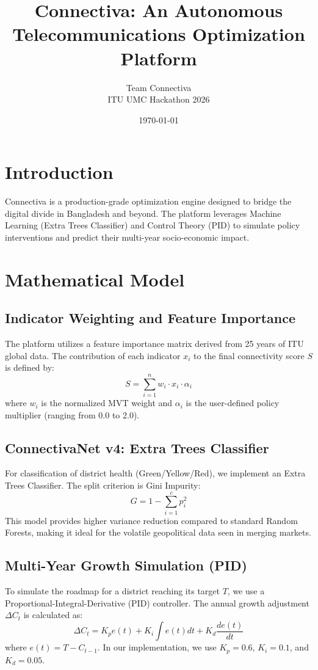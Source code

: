 \documentclass[12pt,a4paper]{article}
\title{Connectiva: An Autonomous Telecommunications Optimization Platform}
\author{Team Connectiva \\ ITU UMC Hackathon 2026}
\date{\today}
\begin{document}
\maketitle

\section{Introduction}
Connectiva is a production-grade optimization engine designed to bridge the digital divide in Bangladesh and beyond. The platform leverages Machine Learning (Extra Trees Classifier) and Control Theory (PID) to simulate policy interventions and predict their multi-year socio-economic impact.

\section{Mathematical Model}

\subsection{Indicator Weighting and Feature Importance}
The platform utilizes a feature importance matrix derived from 25 years of ITU global data. The contribution of each indicator $x_i$ to the final connectivity score $S$ is defined by:
\begin{equation}
S = \sum_{i=1}^{n} w_i \cdot x_i \cdot \alpha_i
\end{equation}
where $w_i$ is the normalized MVT weight and $\alpha_i$ is the user-defined policy multiplier (ranging from 0.0 to 2.0).

\subsection{ConnectivaNet v4: Extra Trees Classifier}
For classification of district health (Green/Yellow/Red), we implement an Extra Trees Classifier. The split criterion is Gini Impurity:
\begin{equation}
G = 1 - \sum_{i=1}^{c} p_i^2
\end{equation}
This model provides higher variance reduction compared to standard Random Forests, making it ideal for the volatile geopolitical data seen in merging markets.

\subsection{Multi-Year Growth Simulation (PID)}
To simulate the roadmap for a district reaching its target $T$, we use a Proportional-Integral-Derivative (PID) controller. The annual growth adjustment $\Delta C_t$ is calculated as:
\begin{equation}
\Delta C_t = K_p e(t) + K_i \int e(t) dt + K_d \frac{de(t)}{dt}
\end{equation}
where $e(t) = T - C_{t-1}$. In our implementation, we use $K_p=0.6$, $K_i=0.1$, and $K_d=0.05$.
\end{document}
